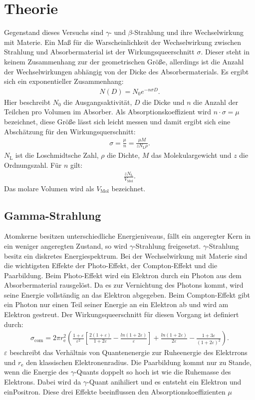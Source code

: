 \section{Theorie}
\label{sec:Theorie}
Gegenstand dieses Versuchs sind $\gamma$- und $\beta$-Strahlung und ihre Wechselwirkung mit Materie.
Ein Maß für die Warscheinlichkeit der Wechselwirkung zwischen Strahlung und Absorbermaterial ist der
Wirkungsqueerschnitt $\sigma$. Dieser steht in keinem Zusammenhang zur der geometrischen Größe, allerdings
ist die Anzahl der Wechselwirkungen abhängig von der Dicke des Absorbermaterials. Es ergibt sich ein
exponentieller Zusammenhang:
\begin{align}
N(D)=N_\mathrm{0}e^{-n\sigma D}.
\end{align}
Hier beschreibt $N_\mathrm{0}$ die Ausgangsaktivität, $D$ die Dicke und $n$ die Anzahl der Teilchen pro
Volumen im Absorber. Als Absorptionskoeffizient wird $n\cdot\sigma=\mu$ bezeichnet, diese Größe lässt sich
leicht messen und damit ergibt sich eine Abschätzung für den Wirkungsquerschnitt:
\begin{align}
\sigma=\frac{\mu}{n}=\frac{\mu M}{zN_\mathrm{L}\rho}.
\end{align}
$N_\mathrm{L}$ ist die Loschmidtsche Zahl, $\rho$ die Dichte, $M$ das Molekulargewicht und $z$ die Ordnungszahl.
Für $n$ gilt:
\begin{align}
\frac{zN_\mathrm{L}}{V_\mathrm{Mol}}.
\end{align}
Das molare Volumen wird als $V_\mathrm{Mol}$ bezeichnet.
\subsection{Gamma-Strahlung}
Atomkerne besitzen unterschiedliche Energieniveaus, fällt ein angeregter Kern in ein weniger angeregten Zustand, so
wird $\gamma$-Strahlung freigesetzt. $\gamma$-Strahlung besitz ein diskretes Energiespektrum.
Bei der Wechselwirkung mit Materie sind die wichtigsten Effekte der Photo-Effekt, der Compton-Effekt und
die Paarbildung.
Beim Photo-Effekt wird ein Elektron durch ein Photon aus dem Absorbermaterial rausgelöst. Da es zur Vernichtung des
Photons kommt, wird seine Energie vollständig an das Elektron abgegeben.
Beim Compton-Effekt gibt ein Photon nur einen Teil seiner Energie an ein Elektron ab und wird am Elektron gestreut.
Der Wirkungsqueerschnitt für diesen Vorgang ist definiert durch:
\begin{align}
\sigma_\mathrm{com}=2\pi r_\mathrm{e}^2\left(\frac{1+\varepsilon}{\varepsilon^2}\left[\frac{2(1+\varepsilon)}{1+2\varepsilon}-\frac{ln(1+2\varepsilon)}{\varepsilon}\right]+\frac{ln(1+2\varepsilon)}{2\varepsilon}-\frac{1+3\varepsilon}{(1+2\varepsilon)^2}\right)\label{ref:sigma}.
\end{align}
$\varepsilon$ beschreibt das Verhältnis von Quantenenergie zur Ruheenergie des Elektrrons und $r_\mathrm{e}$
den klassischen Elektronenradius.
Die Paarbildung kommt nur zu Stande, wenn die Energie des $\gamma$-Quants doppelt so hoch ist wie
die Ruhemasse des Elektrons. Dabei wird da $\gamma$-Quant anihiliert und es entsteht ein Elektron und einPositron.
Diese drei Effekte beeinflussen den Absorptionskoeffizienten $\mu$
